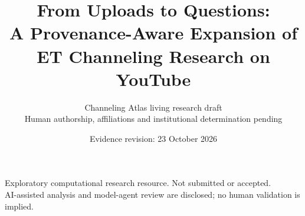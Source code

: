 \documentclass[11pt,letterpaper]{article}
\title{From Uploads to Questions:\\A Provenance-Aware Expansion of ET Channeling Research on YouTube}
\author{Channeling Atlas living research draft\\Human authorship, affiliations and institutional determination pending}
\date{Evidence revision: 23 October 2026}
\begin{document}
\maketitle
\begin{center}\small Exploratory computational research resource. Not submitted or accepted.\\AI-assisted analysis and model-agent review are disclosed; no human validation is implied.\end{center}



\appendix

\end{document}
